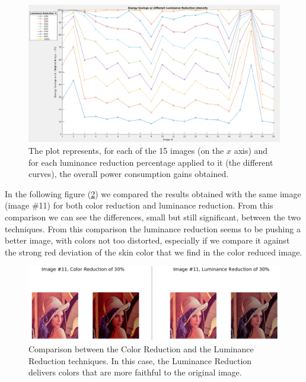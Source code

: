 \documentclass[a4paper]{article}
\begin{document}
            \begin{figure}[htp]
                \centering
                \includegraphics[width=0.8 \columnwidth]{./screenshots/LuminanceReductionOverall}
                \caption{
                        \label{fig:LuminanceReductionOverall}
                        The plot represents, for each of the 15 images (on the $x$ axis) and for each luminance reduction percentage applied to it (the different curves), the overall power consumption gains obtained.
                }
            \end{figure}

            In the following figure (\ref{fig:img11_COLvLUM}) we compared the results obtained with the same image (image \#11) for both color reduction and luminance reduction. From this comparison we can see the differences, small but still significant, between the two techniques. From this comparison the luminance reduction seems to be pushing a better image, with colors not too distorted, especially if we compare it against the strong red deviation of the skin color that we find in the color reduced image.

            \begin{figure}[htp]
                \centering
                \includegraphics[width=0.6 \columnwidth]{./screenshots/img11_COLvLUM}
                \caption{
                        \label{fig:img11_COLvLUM}
                        Comparison between the Color Reduction and the Luminance Reduction techniques. In this case, the Luminance Reduction delivers colors that are more faithful to the original image.
                }
            \end{figure}
\end{document}
